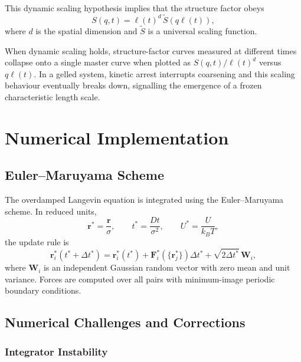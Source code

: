 \documentclass[11pt,a4paper]{article}
\begin{document}
This dynamic scaling hypothesis implies that the structure factor obeys
\begin{equation}
    S(q,t)
    =
    \ell(t)^d\,\widetilde S(q\ell(t)),
    \label{eq:dynamic_scaling}
\end{equation}
where $d$ is the spatial dimension and $\widetilde S$ is a universal scaling function.

When dynamic scaling holds, structure-factor curves measured at different times collapse onto a single master curve when plotted as $S(q,t)/\ell(t)^d$ versus $q\ell(t)$. In a gelled system, kinetic arrest interrupts coarsening and this scaling behaviour eventually breaks down, signalling the emergence of a frozen characteristic length scale.

\section{Numerical Implementation}

\subsection{Euler--Maruyama Scheme}

The overdamped Langevin equation is integrated using the Euler--Maruyama scheme. In reduced units,
\begin{equation}
    \mathbf r^* = \frac{\mathbf r}{\sigma},
    \qquad
    t^* = \frac{Dt}{\sigma^2},
    \qquad
    U^* = \frac{U}{k_B T},
\end{equation}
the update rule is
\begin{equation}
    \mathbf r_i^*(t^*+\Delta t^*)
    =
    \mathbf r_i^*(t^*)
    +
    \mathbf F_i^*(\{\mathbf r_j^*\})\Delta t^*
    +
    \sqrt{2\Delta t^*}\,\mathbf W_i,
    \label{eq:euler_maruyama}
\end{equation}
where $\mathbf W_i$ is an independent Gaussian random vector with zero mean and unit variance. Forces are computed over all pairs with minimum-image periodic boundary conditions.

\subsection{Numerical Challenges and Corrections}

\subsubsection{Integrator Instability}
\end{document}
